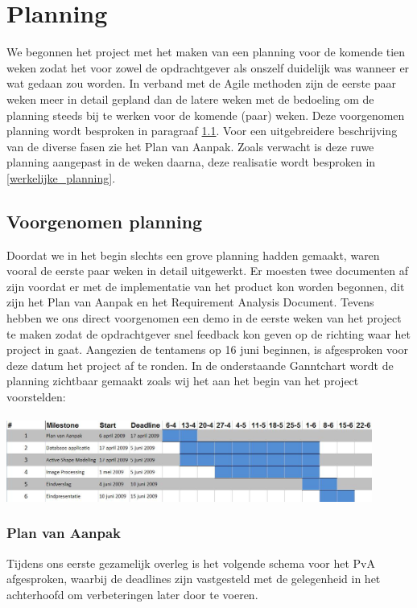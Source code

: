 \chapter{Planning}
\label{Planning}
We begonnen het project met het maken van een planning voor de komende tien
weken zodat het voor zowel de opdrachtgever als onszelf duidelijk was wanneer
er wat gedaan zou worden. In verband met de Agile methoden zijn de eerste paar
weken meer in detail gepland dan de latere weken met de bedoeling om de
planning steeds bij te werken voor de komende (paar) weken. Deze voorgenomen
planning wordt besproken in paragraaf \ref{voorgenomen_planning}. Voor een
uitgebreidere beschrijving van de diverse fasen zie het Plan van Aanpak.
Zoals verwacht is deze ruwe planning aangepast in de
weken daarna, deze realisatie wordt besproken in \ref{werkelijke_planning}.

\section{Voorgenomen planning}
\label{voorgenomen_planning}
Doordat we in het begin slechts een grove planning hadden gemaakt, waren vooral
de eerste paar weken in detail uitgewerkt.
Er moesten twee documenten af zijn voordat er met de implementatie van het product kon worden begonnen, dit zijn het Plan van Aanpak en het Requirement Analysis Document.
Tevens hebben we ons direct voorgenomen een demo in de eerste weken van het project te maken zodat de opdrachtgever snel feedback kon geven op de richting waar het project in gaat.
Aangezien de tentamens op 16 juni beginnen, is afgesproken voor deze datum het project af te ronden.
In de onderstaande Ganntchart wordt de planning zichtbaar gemaakt zoals wij het aan het begin van het project voorstelden:
\\
\\
\includegraphics[width=0.9\textwidth]{ganntbefore}

\subsection{Plan van Aanpak}
Tijdens ons eerste gezamelijk overleg is het volgende schema voor het PvA
afgesproken, waarbij de deadlines zijn vastgesteld met de gelegenheid in het achterhoofd om verbeteringen later door te voeren.

